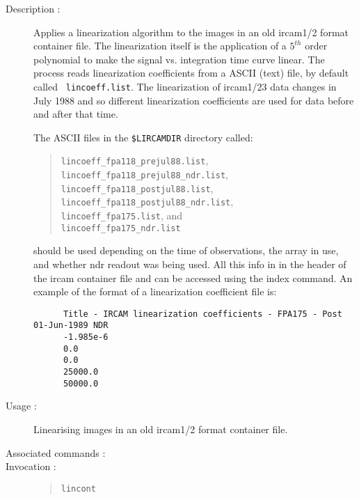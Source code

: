 \begin{description}

\item[Description :] Applies a linearization algorithm to the images in
an old {\sc ircam1/2} format container file.  The linearization itself
is the application of a $5^{th}$ order polynomial to make the signal vs.
integration time curve linear.  The process reads linearization
coefficients from a ASCII (text) file, by default called {\tt
lincoeff.list}.  The linearization of {\sc ircam1/2}3 data changes in
July 1988 and so different linearization coefficients are used for data
before and after that time.

The ASCII files in the {\tt \$LIRCAMDIR} directory called:

\begin{quote}
{\tt lincoeff\_fpa118\_prejul88.list}, \\
{\tt lincoeff\_fpa118\_prejul88\_ndr.list}, \\
{\tt lincoeff\_\-fpa118\_postjul88.list}, \\
{\tt lincoeff\_fpa118\_postjul88\_ndr.list}, \\
{\tt lincoeff\_fpa175.\-list}, and \\
{\tt lincoeff\_fpa175\_ndr.list}
\end{quote}

should be used depending on the time of observations, the array in use,
and whether ndr readout was being used.  All this info in in the header
of the {\sc ircam} container file and can be accessed using the index
command. An example of the format of a linearization coefficient file
is:

\begin{small}
\begin{verbatim}
      Title - IRCAM linearization coefficients - FPA175 - Post 01-Jun-1989 NDR
      -1.985e-6
      0.0
      0.0
      25000.0
      50000.0
\end{verbatim}
\end{small}

\item[Usage :] Linearising images in an old {\sc ircam1/2} format container
file.

\item[Associated commands :] {\tt {}}

\item[Invocation :]

\begin{quote}{\tt  lincont }\end{quote}

\end{description}

